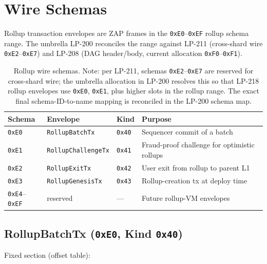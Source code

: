 \section{Wire Schemas}

Rollup transaction envelopes are ZAP frames in the
\texttt{0xE0}--\texttt{0xEF} rollup schema range. The umbrella
LP-200 reconciles the range against LP-211 (cross-shard wire
\texttt{0xE2}--\texttt{0xE7}) and LP-208 (DAG header/body, current
allocation \texttt{0xF0}--\texttt{0xF1}).

\begin{table}[h]
\centering
\small
\begin{tabular}{@{}lllp{5cm}@{}}
\toprule
\textbf{Schema} & \textbf{Envelope} & \textbf{Kind} & \textbf{Purpose} \\
\midrule
\texttt{0xE0} & \texttt{RollupBatchTx} & \texttt{0x40} & Sequencer commit of a batch \\
\texttt{0xE1} & \texttt{RollupChallengeTx} & \texttt{0x41} & Fraud-proof challenge for optimistic rollups \\
\texttt{0xE2} & \texttt{RollupExitTx} & \texttt{0x42} & User exit from rollup to parent L1 \\
\texttt{0xE3} & \texttt{RollupGenesisTx} & \texttt{0x43} & Rollup-creation tx at deploy time \\
\texttt{0xE4}--\texttt{0xEF} & reserved & --- & Future rollup-VM envelopes \\
\bottomrule
\end{tabular}
\caption{Rollup wire schemas. Note: per LP-211, schemas
\texttt{0xE2}--\texttt{0xE7} are reserved for cross-shard wire;
the umbrella allocation in LP-200 resolves this so that
LP-218 rollup envelopes use \texttt{0xE0}, \texttt{0xE1},
plus higher slots in the rollup range. The exact final
schema-ID-to-name mapping is reconciled in the LP-200 schema map.}
\label{tab:schemas}
\end{table}

\subsection{RollupBatchTx (\texttt{0xE0}, Kind \texttt{0x40})}

Fixed section (offset table):

